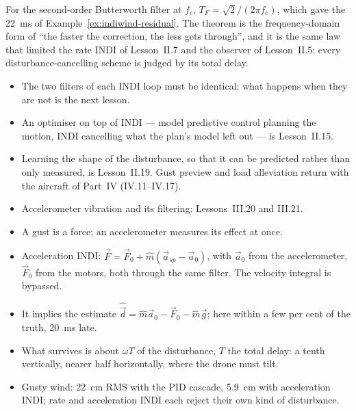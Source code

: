 For the second-order Butterworth filter at $f_c$, $T_F = \sqrt2/(2\pi f_c)$, which gave the \SI{22}{ms} of Example~\ref{ex:indiwind-residual}. The theorem is the frequency-domain form of \enquote{the faster the correction, the less gets through}, and it is the same law that limited the rate INDI of Lesson~II.7 and the observer of Lesson~II.5: every disturbance-cancelling scheme is judged by its total delay.

\begin{lookahead}
\begin{itemize}[leftmargin=1.2em]
  \item The two filters of each INDI loop must be identical; what happens when they are not is the next lesson.
  \item An optimiser on top of INDI — model predictive control planning the motion, INDI cancelling what the plan's model left out — is Lesson~II.15.
  \item Learning the shape of the disturbance, so that it can be predicted rather than only measured, is Lesson~II.19. Gust preview and load alleviation return with the aircraft of Part~IV (IV.11--IV.17).
  \item Accelerometer vibration and its filtering: Lessons~III.20 and III.21.
\end{itemize}
\end{lookahead}

\begin{remember}
\begin{itemize}
  \item A gust is a force; an accelerometer measures its effect at once.
  \item Acceleration INDI: $\vec F = \vec F_0 + \hat m(\vec a_{sp} - \vec a_0)$, with $\vec a_0$ from the accelerometer, $\vec F_0$ from the motors, both through the same filter. The velocity integral is bypassed.
  \item It implies the estimate $\hat{\vec d} = \hat m\vec a_0 - \vec F_0 - \hat m\vec g$; here within a few per cent of the truth, \SI{20}{ms} late.
  \item What survives is about $\omega T$ of the disturbance, $T$ the total delay: a tenth vertically, nearer half horizontally, where the drone must tilt.
  \item Gusty wind: \SI{22}{cm} RMS with the PID cascade, \SI{5.9}{cm} with acceleration INDI; rate and acceleration INDI each reject their own kind of disturbance.
\end{itemize}
\end{remember}

